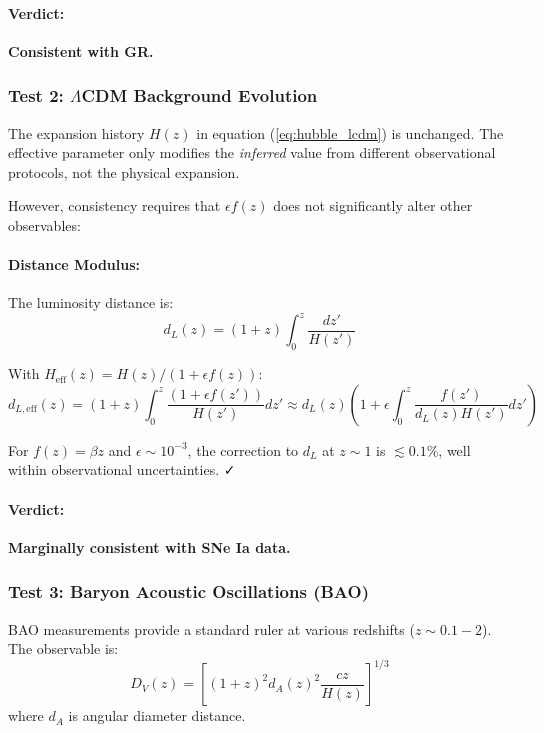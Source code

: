 \paragraph{Verdict:} \textbf{Consistent with GR.}

\subsubsection{Test 2: $\Lambda$CDM Background Evolution}

The expansion history $H(z)$ in equation (\ref{eq:hubble_lcdm}) is unchanged. The effective parameter only modifies the \textit{inferred} value from different observational protocols, not the physical expansion.

However, consistency requires that $\epsilon f(z)$ does not significantly alter other observables:

\paragraph{Distance Modulus:}
The luminosity distance is:
\begin{equation}
d_L(z) = (1+z) \int_0^z \frac{dz'}{H(z')}
\label{eq:luminosity_distance}
\end{equation}

With $H_{\text{eff}}(z) = H(z)/(1 + \epsilon f(z))$:
\begin{equation}
d_{L,\text{eff}}(z) = (1+z) \int_0^z \frac{(1 + \epsilon f(z'))}{H(z')} dz' \approx d_L(z) \left(1 + \epsilon \int_0^z \frac{f(z')}{d_L(z) H(z')} dz'\right)
\label{eq:dl_eff}
\end{equation}

For $f(z) = \beta z$ and $\epsilon \sim 10^{-3}$, the correction to $d_L$ at $z \sim 1$ is $\lesssim 0.1\%$, well within observational uncertainties. ✓

\paragraph{Verdict:} \textbf{Marginally consistent with SNe Ia data.}

\subsubsection{Test 3: Baryon Acoustic Oscillations (BAO)}

BAO measurements provide a standard ruler at various redshifts ($z \sim 0.1 - 2$). The observable is:
\begin{equation}
D_V(z) = \left[ (1+z)^2 d_A(z)^2 \frac{cz}{H(z)} \right]^{1/3}
\label{eq:dv_bao}
\end{equation}
where $d_A$ is angular diameter distance.

